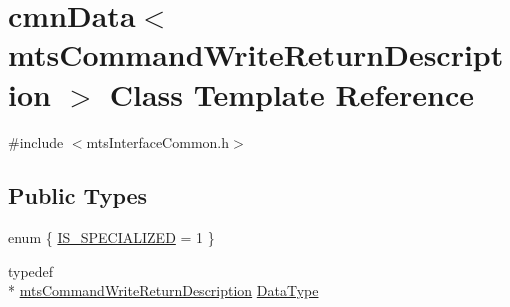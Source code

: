 \hypertarget{classcmn_data_3_01mts_command_write_return_description_01_4}{\section{cmn\-Data$<$ mts\-Command\-Write\-Return\-Description $>$ Class Template Reference}
\label{classcmn_data_3_01mts_command_write_return_description_01_4}
}


{\ttfamily \#include $<$mts\-Interface\-Common.\-h$>$}

\subsection*{Public Types}
\begin{DoxyCompactItemize}
\item 
enum \{ \hyperlink{classcmn_data_3_01mts_command_write_return_description_01_4_a4fbf8d6468b7f5a5b1be1e22e1cba1d2a7af3d63cf2681ec419036e6b3139a850}{I\-S\-\_\-\-S\-P\-E\-C\-I\-A\-L\-I\-Z\-E\-D} = 1
 \}
\item 
typedef \\*
\hyperlink{classmts_command_write_return_description}{mts\-Command\-Write\-Return\-Description} \hyperlink{classcmn_data_3_01mts_command_write_return_description_01_4_abe59247ead6cb32213ea0a76d9ae56a6}{Data\-Type}
\end{DoxyCompactItemize}
